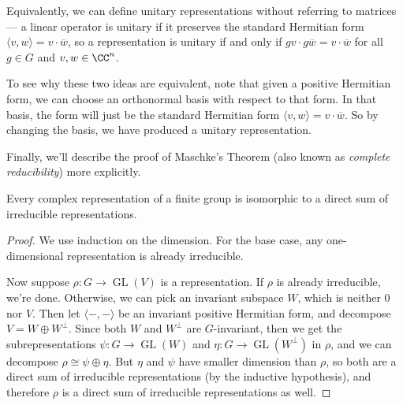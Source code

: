 Equivalently, we can define unitary representations without referring to matrices --- a linear operator is unitary if it preserves the standard Hermitian form $\langle v, w \rangle = v\cdot \overline{w}$, so a representation is unitary if and only if $gv \cdot g\overline{w} = v \cdot \overline{w}$ for all $g \in G$ and $v, w \in \CC^n$.

To see why these two ideas are equivalent, note that given a positive Hermitian form, we can choose an orthonormal basis with respect to that form. In that basis, the form will just be the standard Hermitian form $\langle v, w \rangle = v\cdot \overline{w}$. So by changing the basis, we have produced a unitary representation. 

Finally, we'll describe the proof of Maschke's Theorem (also known as \emph{complete reducibility}) more explicitly.

\begin{theorem}
Every complex representation of a finite group is isomorphic to a direct sum of irreducible representations.
\end{theorem}

\begin{proof}
We use induction on the dimension. For the base case, any one-dimensional representation is already irreducible. 

Now suppose $\rho : G \to \operatorname{GL}(V)$ is a representation. If $\rho$ is already irreducible, we're done. Otherwise, we can pick an invariant subspace $W$, which is neither $0$ nor $V$. Then let $\langle -, -\rangle$ be an invariant positive Hermitian form, and decompose $V = W \oplus W^\perp$. Since both $W$ and $W^\perp$ are $G$-invariant, then we get the subrepresentations $\psi : G \to \operatorname{GL}(W)$ and $\eta : G \to \operatorname{GL}(W^\perp)$ in $\rho$, and we can decompose $\rho \cong \psi \oplus \eta$. But $\eta$ and $\psi$ have smaller dimension than $\rho$, so both are a direct sum of irreducible representations (by the inductive hypothesis), and therefore $\rho$ is a direct sum of irreducible representations as well. 
\end{proof}





